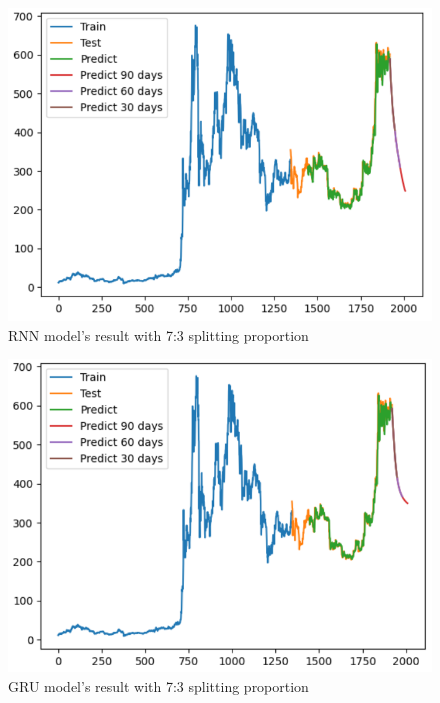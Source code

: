 \documentclass{ieeeojies}
\begin{document}
\begin{figure}[H]
	\centering
	\begin{minipage}{0.6\linewidth}
		\centering
		\includegraphics[width=\linewidth]{bibliography/Images/RNN_BNB_73.PNG}
		\caption{RNN model's result with 7:3 splitting proportion}
	\end{minipage}
\end{figure}
\begin{figure}[H]
	\centering
	\begin{minipage}{0.6\linewidth}
		\centering
		\includegraphics[width=\linewidth]{bibliography/Images/GRU_BNB_73.PNG}
		\caption{GRU model's result with 7:3 splitting proportion}
	\end{minipage}
\end{figure}
\end{document}
